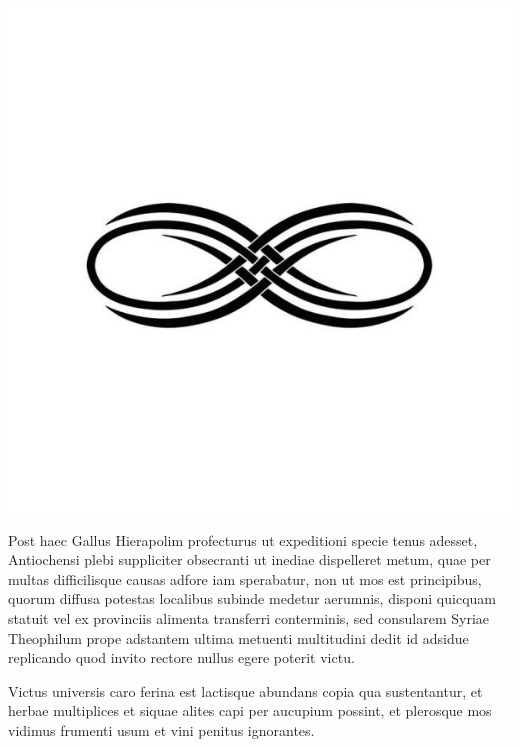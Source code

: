 \documentclass[12pt]{article}
\begin{document}
\begin{center}
\includegraphics[scale=00.20]{infini}
\end{center}


\setlength{\headheight}{13pt} %
\setlength{\headsep}{2.5cm} %
\setlength{\footskip}{2.5cm}

\linespread{1.5}


\newpage
\thispagestyle{empty}
\pagestyle{fancyplain} \chead{} 
\tableofcontents


\newpage
Post haec Gallus Hierapolim profecturus ut expeditioni specie tenus adesset, Antiochensi plebi suppliciter obsecranti ut inediae dispelleret metum, quae per multas difficilisque causas adfore iam sperabatur, non ut mos est principibus, quorum diffusa potestas localibus subinde medetur aerumnis, disponi quicquam statuit vel ex provinciis alimenta transferri conterminis, sed consularem Syriae Theophilum prope adstantem ultima metuenti multitudini dedit id adsidue replicando quod invito rectore nullus egere poterit victu.

Victus universis caro ferina est lactisque abundans copia qua sustentantur, et herbae multiplices et siquae alites capi per aucupium possint, et plerosque mos vidimus frumenti usum et vini penitus ignorantes.
\end{document}
